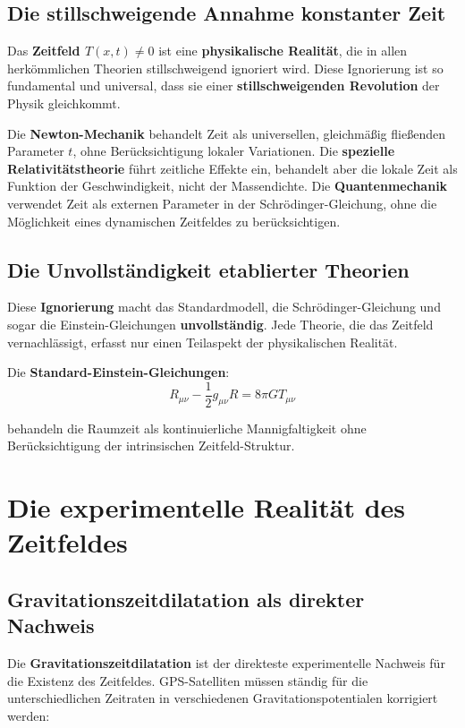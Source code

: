 \documentclass[12pt,a4paper]{report}
\begin{document}
	\subsection{Die stillschweigende Annahme konstanter Zeit}
	
	Das \textbf{Zeitfeld $T(x,t) \neq 0$} ist eine \textbf{physikalische Realität}, die in allen herkömmlichen Theorien stillschweigend ignoriert wird. Diese Ignorierung ist so fundamental und universal, dass sie einer \textbf{stillschweigenden Revolution} der Physik gleichkommt.
	
	Die \textbf{Newton-Mechanik} behandelt Zeit als universellen, gleichmäßig fließenden Parameter $t$, ohne Berücksichtigung lokaler Variationen. Die \textbf{spezielle Relativitätstheorie} führt zeitliche Effekte ein, behandelt aber die lokale Zeit als Funktion der Geschwindigkeit, nicht der Massendichte. Die \textbf{Quantenmechanik} verwendet Zeit als externen Parameter in der Schrödinger-Gleichung, ohne die Möglichkeit eines dynamischen Zeitfeldes zu berücksichtigen.
	
	\subsection{Die Unvollständigkeit etablierter Theorien}
	
	Diese \textbf{Ignorierung} macht das Standardmodell, die Schrödinger-Gleichung und sogar die Einstein-Gleichungen \textbf{unvollständig}. Jede Theorie, die das Zeitfeld vernachlässigt, erfasst nur einen Teilaspekt der physikalischen Realität.
	
	Die \textbf{Standard-Einstein-Gleichungen}:
	\begin{equation}
		R_{\mu\nu} - \frac{1}{2}g_{\mu\nu}R = 8\pi G T_{\mu\nu}
	\end{equation}
	
	behandeln die Raumzeit als kontinuierliche Mannigfaltigkeit ohne Berücksichtigung der intrinsischen Zeitfeld-Struktur.
	
	\section{Die experimentelle Realität des Zeitfeldes}
	
	\subsection{Gravitationszeitdilatation als direkter Nachweis}
	
	Die \textbf{Gravitationszeitdilatation} ist der direkteste experimentelle Nachweis für die Existenz des Zeitfeldes. GPS-Satelliten müssen ständig für die unterschiedlichen Zeitraten in verschiedenen Gravitationspotentialen korrigiert werden:
	
\end{document}
